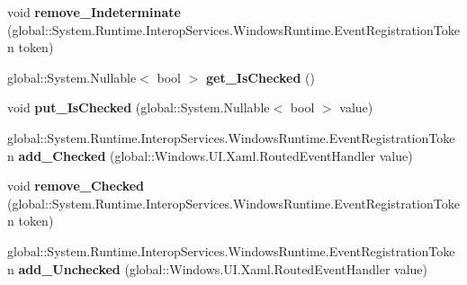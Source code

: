 \begin{DoxyCompactItemize}
void {\bfseries remove\+\_\+\+Indeterminate} (global\+::\+System.\+Runtime.\+Interop\+Services.\+Windows\+Runtime.\+Event\+Registration\+Token token)
\item 
\mbox{\label{interface_windows_1_1_u_i_1_1_xaml_1_1_controls_1_1_primitives_1_1_i_toggle_button_ab2f2c05633de2713aaa610f12657e543}} 
global\+::\+System.\+Nullable$<$ bool $>$ {\bfseries get\+\_\+\+Is\+Checked} ()
\item 
\mbox{\label{interface_windows_1_1_u_i_1_1_xaml_1_1_controls_1_1_primitives_1_1_i_toggle_button_afaace15befe9dea02eb0d81c76b8ff32}} 
void {\bfseries put\+\_\+\+Is\+Checked} (global\+::\+System.\+Nullable$<$ bool $>$ value)
\item 
\mbox{\label{interface_windows_1_1_u_i_1_1_xaml_1_1_controls_1_1_primitives_1_1_i_toggle_button_a9579b9435c7ea6041a3d25d96e4e02b6}} 
global\+::\+System.\+Runtime.\+Interop\+Services.\+Windows\+Runtime.\+Event\+Registration\+Token {\bfseries add\+\_\+\+Checked} (global\+::\+Windows.\+U\+I.\+Xaml.\+Routed\+Event\+Handler value)
\item 
\mbox{\label{interface_windows_1_1_u_i_1_1_xaml_1_1_controls_1_1_primitives_1_1_i_toggle_button_afa5ff3c678236b48b302c60a17489ad3}} 
void {\bfseries remove\+\_\+\+Checked} (global\+::\+System.\+Runtime.\+Interop\+Services.\+Windows\+Runtime.\+Event\+Registration\+Token token)
\item 
\mbox{\label{interface_windows_1_1_u_i_1_1_xaml_1_1_controls_1_1_primitives_1_1_i_toggle_button_af2a52e0a9086bccd03127ee7044692ab}} 
global\+::\+System.\+Runtime.\+Interop\+Services.\+Windows\+Runtime.\+Event\+Registration\+Token {\bfseries add\+\_\+\+Unchecked} (global\+::\+Windows.\+U\+I.\+Xaml.\+Routed\+Event\+Handler value)
\item 
\mbox{\label{interface_windows_1_1_u_i_1_1_xaml_1_1_controls_1_1_primitives_1_1_i_toggle_button_a4828a2c0dc3818cf5b0a8b6f35fbd268}} 

\end{DoxyCompactItemize}
